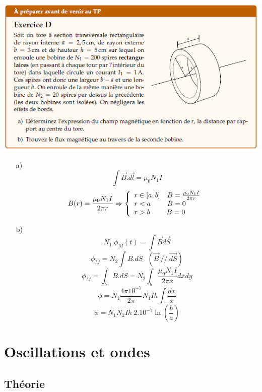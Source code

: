 \documentclass	[11pt, a4paper, openany]{book}
\begin{document}
			\newpage
			\begin{center}
			\includegraphics[scale=1]{prepa/exoD.png}\\
			\end{center}
			\begin{itemize}
			\item[a) ] 
			$$\int \vec{B}.\vec{dl} = \mu_0 N_1I$$
			$$B(r) = \frac{\mu_0 N_1I}{2\pi r}
			\Rightarrow \left\{\begin{array}{l}
			r \in [a,b] \ \ \  B = \frac{\mu_0 N_1I}{2\pi r}\\
			r < a\ \ \ \ \ \ \ B = 0\\
			r > b\ \ \ \ \ \ \ B = 0\end{array}\right.\\$$
			
			
			\item[b) ]
			$$N_1. \phi_M(t) = \int \vec{B}\vec{dS}$$
			$$\phi_M = N_2 \int B.dS\ \ \ (\vec{B}\ //\ \vec{dS})$$
			$$\phi_M = \int_b B.dS = N_2 \int_b \frac{\mu_0 N_1 I}{2\pi x} dxdy$$
			$$\phi = N_1 \frac{4\pi 10^{-7}}{2\pi}N_1 I h \int \frac{dx}{x}$$
			$$\phi = N_1 N_2 I h\ 2.10^{-7}\ln\left(\frac{b}{a}\right)$$
			\end{itemize}
			
			
			\newpage
			\section{Oscillations et ondes}
			\subsection{Théorie}
			
			
\end{document}
